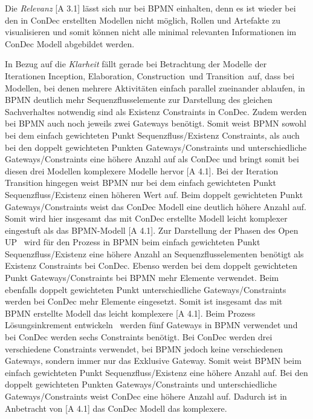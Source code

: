 Die \textit{Relevanz} [A 3.1] lässt sich nur bei BPMN einhalten, denn es ist wieder bei den in ConDec erstellten Modellen nicht möglich, Rollen und Artefakte zu visualisieren und somit können nicht alle minimal relevanten Informationen im ConDec Modell abgebildet werden.\newline

In Bezug auf die \textit{Klarheit} fällt gerade bei Betrachtung der Modelle der Iterationen \grqq Inception\grqq, \grqq Elaboration\grqq, \grqq Construction\grqq \ und \grqq Transition\grqq \ auf, dass bei Modellen, bei denen mehrere Aktivitäten einfach parallel zueinander ablaufen, in BPMN deutlich mehr Sequenzflusselemente zur Darstellung des gleichen Sachverhaltes notwendig sind als Existenz Constraints in ConDec. Zudem werden bei BPMN auch noch jeweils zwei Gateways benötigt. Somit weist BPMN sowohl bei dem einfach gewichteten Punkt Sequenzfluss/Existenz Constraints, als auch bei den doppelt gewichteten Punkten Gateways/Constraints und unterschiedliche Gateways/Constraints eine höhere Anzahl auf als ConDec und bringt somit bei diesen drei Modellen komplexere Modelle hervor [A 4.1]. \newline
Bei der Iteration Transition hingegen weist BPMN nur bei dem einfach gewichteten Punkt Sequenzfluss/Existenz einen höheren Wert auf. Beim doppelt gewichteten Punkt Gateways/Constraints weist das ConDec Modell eine deutlich höhere Anzahl auf. Somit wird hier insgesamt das mit ConDec erstellte Modell leicht komplexer eingestuft als das BPMN-Modell [A 4.1].\newline
Zur Darstellung der  \grqq Phasen des Open UP \grqq \ wird für den Prozess in BPMN beim einfach gewichteten Punkt Sequenzfluss/Existenz eine höhere Anzahl an Sequenzflusselementen benötigt als Existenz Constraints bei ConDec. Ebenso werden bei dem doppelt gewichteten Punkt Gateways/Constraints bei BPMN mehr Elemente verwendet. Beim ebenfalls doppelt gewichteten Punkt unterschiedliche Gateways/Constraints werden bei ConDec mehr Elemente eingesetzt. Somit ist insgesamt das mit BPMN erstellte Modell das leicht komplexere [A 4.1].  \newline
Beim Prozess \grqq Lösungsinkrement entwickeln \grqq \ werden fünf Gateways in BPMN verwendet und bei ConDec werden sechs Constraints benötigt. Bei ConDec werden drei verschiedene Constraints verwendet, bei BPMN jedoch keine verschiedenen Gateways, sondern immer nur das Exklusive Gateway. Somit weist BPMN beim einfach gewichteten Punkt Sequenzfluss/Existenz eine höhere Anzahl auf. Bei den doppelt gewichteten Punkten Gateways/Constraints und unterschiedliche Gateways/Constraints weist ConDec eine höhere Anzahl auf. Dadurch ist in Anbetracht von [A 4.1] das ConDec Modell das komplexere.\newline
